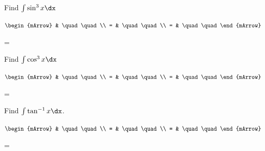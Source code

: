 \begin{mtask}[resume]
   \task \begin{exercise} Find $\int \sin^3{x} \dx$
           \begin{envSolution}
             $\begin{mArrow}
                   & \quad \quad              \\
		   		 = & \quad \quad              \\
				 = & \quad \quad 
              \end{mArrow}$
            \begin{shortsolution}  
			     =$ \quad \quad \quad \quad$
			\end{shortsolution}				 
           \end{envSolution}
         \end{exercise}
\end{mtask}

\begin{mtask}[resume]
   \task \begin{exercise} Find $\int \cos^3{x} \dx$
           \begin{envSolution}
             $\begin{mArrow}
                   & \quad \quad              \\
		   		 = & \quad \quad              \\
				 = & \quad \quad 
              \end{mArrow}$
            \begin{shortsolution}  
			     =$ \quad \quad \quad \quad$
			\end{shortsolution}				 
           \end{envSolution}
         \end{exercise}
\end{mtask}

\clearpage\noindent%
\begin{mtask}[resume]

   \task \begin{exercise} Find $\int \tan^{-1}x \dx$.
           \begin{envSolution}
             $\begin{mArrow}
                   & \quad \quad              \\
		   		 = & \quad \quad              \\
				 = & \quad \quad 
              \end{mArrow}$
            \begin{shortsolution}  
			     =$ \quad \quad \quad \quad$
			\end{shortsolution}				 
           \end{envSolution}
         \end{exercise}
\end{mtask}

